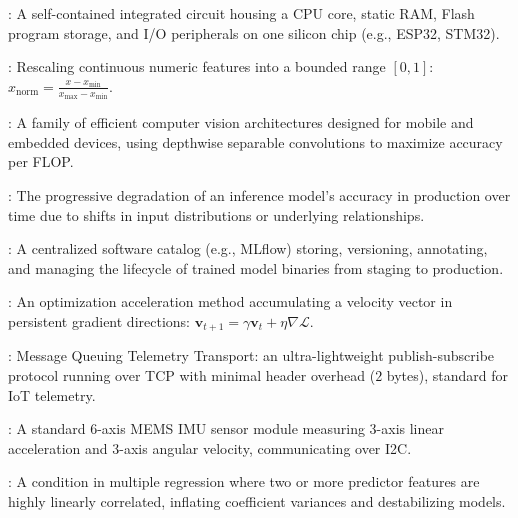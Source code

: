 \begin{description}[leftmargin=!,labelwidth=4.5cm,itemsep=1.5ex]
\item[\textbf{Microcontroller (MCU)}\hfill \textnormal{\sffamily\scriptsize\color{keyideablue}[IoT \& Hardware]}]: A self-contained integrated circuit housing a CPU core, static RAM, Flash program storage, and I/O peripherals on one silicon chip (e.g., ESP32, STM32).
\item[\textbf{Min-Max Normalization}\hfill \textnormal{\sffamily\scriptsize\color{keyideablue}[Data Engineering]}]: Rescaling continuous numeric features into a bounded range $[0, 1]$: $x_{\text{norm}} = \frac{x - x_{\min}}{x_{\max} - x_{\min}}$.
\item[\textbf{MobileNet}\hfill \textnormal{\sffamily\scriptsize\color{keyideablue}[Deep Learning]}]: A family of efficient computer vision architectures designed for mobile and embedded devices, using depthwise separable convolutions to maximize accuracy per FLOP.
\item[\textbf{Model Drift}\hfill \textnormal{\sffamily\scriptsize\color{keyideablue}[MLOps]}]: The progressive degradation of an inference model's accuracy in production over time due to shifts in input distributions or underlying relationships.
\item[\textbf{Model Registry}\hfill \textnormal{\sffamily\scriptsize\color{keyideablue}[MLOps]}]: A centralized software catalog (e.g., MLflow) storing, versioning, annotating, and managing the lifecycle of trained model binaries from staging to production.
\item[\textbf{Momentum}\hfill \textnormal{\sffamily\scriptsize\color{keyideablue}[Optimization]}]: An optimization acceleration method accumulating a velocity vector in persistent gradient directions: $\mathbf{v}_{t+1} = \gamma \mathbf{v}_t + \eta \nabla \mathcal{L}$.
\item[\textbf{MQTT}\hfill \textnormal{\sffamily\scriptsize\color{keyideablue}[IoT \& Networking]}]: Message Queuing Telemetry Transport: an ultra-lightweight publish-subscribe protocol running over TCP with minimal header overhead ($2$ bytes), standard for IoT telemetry.
\item[\textbf{MPU-6050}\hfill \textnormal{\sffamily\scriptsize\color{keyideablue}[IoT \& Hardware]}]: A standard 6-axis MEMS IMU sensor module measuring 3-axis linear acceleration and 3-axis angular velocity, communicating over I2C.
\item[\textbf{Multicollinearity}\hfill \textnormal{\sffamily\scriptsize\color{keyideablue}[Statistics]}]: A condition in multiple regression where two or more predictor features are highly linearly correlated, inflating coefficient variances and destabilizing models.

\end{description}
